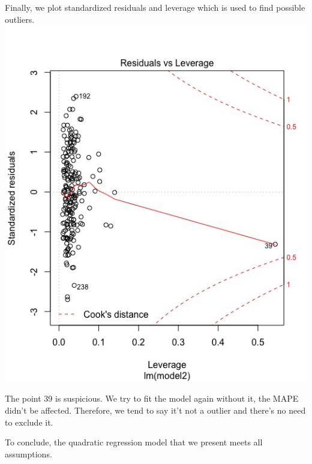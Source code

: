 \documentclass[letterpaper,10pt]{article}
\begin{document}
Finally, we plot standardized residuals and leverage which is used to find possible outliers.
\includegraphics[scale=0.6]{outliers.jpeg}

The point 39 is suspicious. We try to fit the model again without it, the MAPE didn't be affected. Therefore, we tend to say it't not a outlier and there's no need to exclude it.

To conclude, the quadratic regression model that we present meets all assumptions. 











\end{document}
